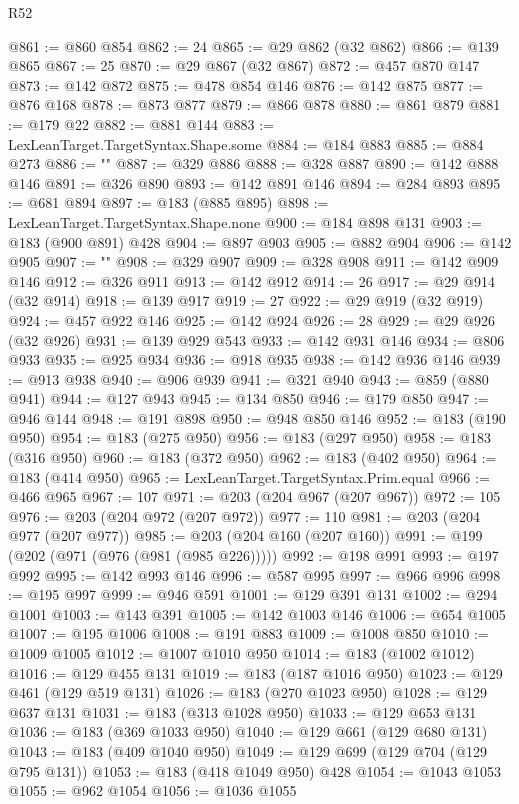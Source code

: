 \begin{lexlean}{R52}
\begin{coremodule}
@861 := @860 @854
@862 := 24
@865 := @29 @862 (@32 @862)
@866 := @139 @865
@867 := 25
@870 := @29 @867 (@32 @867)
@872 := @457 @870 @147
@873 := @142 @872
@875 := @478 @854 @146
@876 := @142 @875
@877 := @876 @168
@878 := @873 @877
@879 := @866 @878
@880 := @861 @879
@881 := @179 @22
@882 := @881 @144
@883 := LexLeanTarget.TargetSyntax.Shape.some
@884 := @184 @883
@885 := @884 @273
@886 := "{"
@887 := @329 @886
@888 := @328 @887
@890 := @142 @888 @146
@891 := @326 @890
@893 := @142 @891 @146
@894 := @284 @893
@895 := @681 @894
@897 := @183 (@885 @895)
@898 := LexLeanTarget.TargetSyntax.Shape.none
@900 := @184 @898 @131
@903 := @183 (@900 @891) @428
@904 := @897 @903
@905 := @882 @904
@906 := @142 @905
@907 := "}"
@908 := @329 @907
@909 := @328 @908
@911 := @142 @909 @146
@912 := @326 @911
@913 := @142 @912
@914 := 26
@917 := @29 @914 (@32 @914)
@918 := @139 @917
@919 := 27
@922 := @29 @919 (@32 @919)
@924 := @457 @922 @146
@925 := @142 @924
@926 := 28
@929 := @29 @926 (@32 @926)
@931 := @139 @929 @543
@933 := @142 @931 @146
@934 := @806 @933
@935 := @925 @934
@936 := @918 @935
@938 := @142 @936 @146
@939 := @913 @938
@940 := @906 @939
@941 := @321 @940
@943 := @859 (@880 @941)
@944 := @127 @943
@945 := @134 @850
@946 := @179 @850
@947 := @946 @144
@948 := @191 @898
@950 := @948 @850 @146
@952 := @183 (@190 @950)
@954 := @183 (@275 @950)
@956 := @183 (@297 @950)
@958 := @183 (@316 @950)
@960 := @183 (@372 @950)
@962 := @183 (@402 @950)
@964 := @183 (@414 @950)
@965 := LexLeanTarget.TargetSyntax.Prim.equal
@966 := @466 @965
@967 := 107
@971 := @203 (@204 @967 (@207 @967))
@972 := 105
@976 := @203 (@204 @972 (@207 @972))
@977 := 110
@981 := @203 (@204 @977 (@207 @977))
@985 := @203 (@204 @160 (@207 @160))
@991 := @199 (@202 (@971 (@976 (@981 (@985 @226)))))
@992 := @198 @991
@993 := @197 @992
@995 := @142 @993 @146
@996 := @587 @995
@997 := @966 @996
@998 := @195 @997
@999 := @946 @591
@1001 := @129 @391 @131
@1002 := @294 @1001
@1003 := @143 @391
@1005 := @142 @1003 @146
@1006 := @654 @1005
@1007 := @195 @1006
@1008 := @191 @883
@1009 := @1008 @850
@1010 := @1009 @1005
@1012 := @1007 @1010 @950
@1014 := @183 (@1002 @1012)
@1016 := @129 @455 @131
@1019 := @183 (@187 @1016 @950)
@1023 := @129 @461 (@129 @519 @131)
@1026 := @183 (@270 @1023 @950)
@1028 := @129 @637 @131
@1031 := @183 (@313 @1028 @950)
@1033 := @129 @653 @131
@1036 := @183 (@369 @1033 @950)
@1040 := @129 @661 (@129 @680 @131)
@1043 := @183 (@409 @1040 @950)
@1049 := @129 @699 (@129 @704 (@129 @795 @131))
@1053 := @183 (@418 @1049 @950) @428
@1054 := @1043 @1053
@1055 := @962 @1054
@1056 := @1036 @1055

\end{coremodule}
\end{lexlean}
